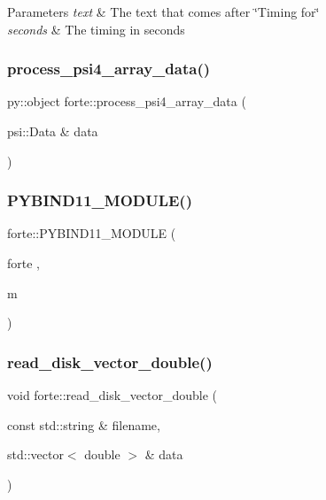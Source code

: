 \begin{DoxyParams}{Parameters}
{\em text} & The text that comes after \char`\"{}\+Timing for\char`\"{} \\
\hline
{\em seconds} & The timing in seconds \\
\hline
\end{DoxyParams}
\mbox{\label{namespaceforte_a1f1e8fac233e0761c98d87f879ceef93}} 
\subsubsection{\texorpdfstring{process\+\_\+psi4\+\_\+array\+\_\+data()}{process\_psi4\_array\_data()}}
{\footnotesize\ttfamily py\+::object forte\+::process\+\_\+psi4\+\_\+array\+\_\+data (\begin{DoxyParamCaption}\item[{psi\+::\+Data \&}]{data }\end{DoxyParamCaption})}

\mbox{\label{namespaceforte_ae3f86c3917f37a8efe973b9ecc7edd67}} 
\subsubsection{\texorpdfstring{P\+Y\+B\+I\+N\+D11\+\_\+\+M\+O\+D\+U\+L\+E()}{PYBIND11\_MODULE()}}
{\footnotesize\ttfamily forte\+::\+P\+Y\+B\+I\+N\+D11\+\_\+\+M\+O\+D\+U\+LE (\begin{DoxyParamCaption}\item[{forte}]{,  }\item[{m}]{ }\end{DoxyParamCaption})}

\mbox{\label{namespaceforte_ac1ea79f74345126170235a50418524ad}} 
\subsubsection{\texorpdfstring{read\+\_\+disk\+\_\+vector\+\_\+double()}{read\_disk\_vector\_double()}}
{\footnotesize\ttfamily void forte\+::read\+\_\+disk\+\_\+vector\+\_\+double (\begin{DoxyParamCaption}\item[{const std\+::string \&}]{filename,  }\item[{std\+::vector$<$ double $>$ \&}]{data }\end{DoxyParamCaption})}



